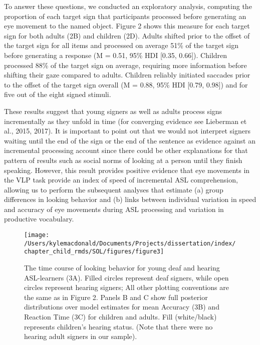 \documentclass[oneside]{report}
\begin{document}
To answer these questions, we conducted an exploratory analysis,
computing the proportion of each target sign that participants processed
before generating an eye movement to the named object. Figure 2 shows
this measure for each target sign for both adults (2B) and children
(2D). Adults shifted prior to the offset of the target sign for all
items and processed on average 51\% of the target sign before generating
a response (M = 0.51, 95\% HDI {[}0.35, 0.66{]}). Children processed
88\% of the target sign on average, requiring more information before
shifting their gaze compared to adults. Children reliably initiated
saccades prior to the offset of the target sign overall (M = 0.88, 95\%
HDI {[}0.79, 0.98{]}) and for five out of the eight signed stimuli.

These results suggest that young signers as well as adults process signs
incrementally as they unfold in time (for converging evidence see
Lieberman et al., 2015, 2017). It is important to point out that we
would not interpret signers waiting until the end of the sign or the end
of the sentence as evidence against an incremental processing account
since there could be other explanations for that pattern of results such
as social norms of looking at a person until they finish speaking.
However, this result provides positive evidence that eye movements in
the VLP task provide an index of speed of incremental ASL comprehension,
allowing us to perform the subsequent analyses that estimate (a) group
differences in looking behavior and (b) links between individual
variation in speed and accuracy of eye movements during ASL processing
and variation in productive vocabulary.
\begin{figure}[!t]

{\centering \texttt{[image: /Users/kylemacdonald/Documents/Projects/dissertation/index/chapter\_child\_rmds/SOL/figures/figure3]} 

}

\caption[The time course of looking behavior for young deaf and hearing ASL-learners]{The time course of looking behavior for young deaf and hearing ASL-learners (3A). Filled circles represent deaf signers, while open circles represent hearing signers; All other plotting conventions are the same as in Figure 2. Panels B and C show full posterior distributions over model estimates for mean Accuracy (3B) and Reaction Time (3C) for children and adults. Fill (white/black) represents children's hearing status. (Note that there were no hearing adult signers in our sample).}\label{fig:sol-tc-coda-figure}
\end{figure}
\end{document}
